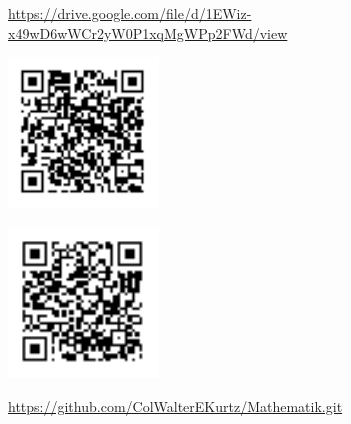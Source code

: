 \clearpage
\thispagestyle{empty}%
\begingroup
\centering
\url{https://drive.google.com/file/d/1EWiz-x49wD6wWCr2yW0P1xqMgWPp2FWd/view}\par
\includegraphics[width=4cm]{qrgoogledrive.pdf}\par
\vspace*{\fill}
\includegraphics[width=4cm]{qrgithub.pdf}\par
\url{https://github.com/ColWalterEKurtz/Mathematik.git}\par
\endgroup
\clearpage
